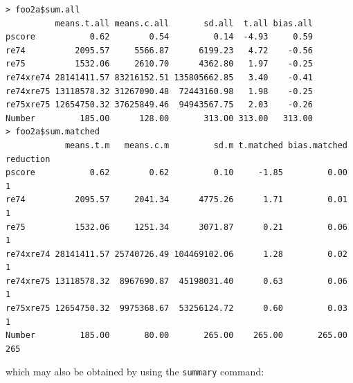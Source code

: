 \documentclass[oneside,letterpaper,titlepage]{article}
\begin{document}
\begin{footnotesize}
\begin{verbatim}
> foo2a$sum.all
          means.t.all means.c.all       sd.all  t.all bias.all
pscore           0.62        0.54         0.14  -4.93     0.59
re74          2095.57     5566.87      6199.23   4.72    -0.56
re75          1532.06     2610.70      4362.80   1.97    -0.25
re74xre74 28141411.57 83216152.51 135805662.85   3.40    -0.41
re74xre75 13118578.32 31267090.48  72443160.98   1.98    -0.25
re75xre75 12654750.32 37625849.46  94943567.75   2.03    -0.26
Number         185.00      128.00       313.00 313.00   313.00
> foo2a$sum.matched
            means.t.m   means.c.m         sd.m t.matched bias.matched reduction
pscore           0.62        0.62         0.10     -1.85         0.00         1
re74          2095.57     2041.34      4775.26      1.71         0.01         1
re75          1532.06     1251.34      3071.87      0.21         0.06         1
re74xre74 28141411.57 25740726.49 104469102.06      1.28         0.02         1
re74xre75 13118578.32  8967690.87  45198031.40      0.63         0.06         1
re75xre75 12654750.32  9975368.67  53256124.72      0.60         0.03         1
Number         185.00       80.00       265.00    265.00       265.00       265
\end{verbatim}
\end{footnotesize}

which may also be obtained by using the \texttt{summary} command:
\end{document}

